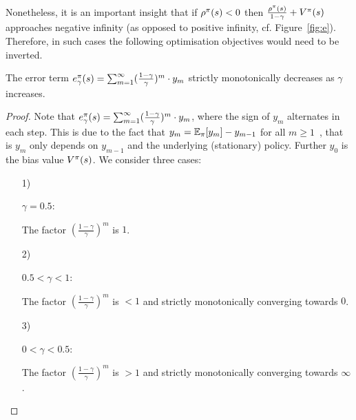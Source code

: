 \documentclass[envcountsame]{llncs}
\begin{document}
\begin{remark}
  Nonetheless, it is an important insight that if \(\rho^{\pi}(s) < 0\) then
  \(\frac{\rho^{\pi}(s)}{1-\gamma} + V^{\pi}(s)\) approaches negative infinity (as opposed to
  positive infinity, cf. Figure~\ref{fig:e}). Therefore, in such cases the following optimisation
  objectives would need to be inverted.
\end{remark}


\begin{lemma}
  \label{lem:err}
  The error term
  \(e_{\gamma}^{\pi}(s) = \sum_{m=1}^{\infty}(\frac{1-\gamma}{\gamma})^{m} \cdot y_{m}\) strictly
  monotonically decreases as $\gamma$ increases.
\end{lemma}

\begin{proof}
  Note that \(e_{\gamma}^{\pi}(s) = \sum_{m=1}^{\infty}(\frac{1-\gamma}{\gamma})^{m} \cdot y_{m}\),
  where the sign of \(y_{m}\) alternates in each step. This is due to the fact that
  \(y_{m} = \operatorname*{\mathbb{E}}_{\pi} [ y_{m} ] - y_{m-1}\) for all \(m \geqslant 1\)~\cite[p.346]{Puterman94}, that
  is \(y_{m}\) only depends on \(y_{m-1}\) and the underlying (stationary) policy. Further \(y_{0}\)
  is the bias value \(V^{\pi}(s)\).
  We consider three cases:
  \begin{enumerate}
  \item[1)]
    \begin{minipage}[t]{0.17\textwidth}
      \(\gamma = 0.5\):
    \end{minipage}
    The factor \((\frac{1-\gamma}{\gamma})^{m}\) is $1$.
  \item[2)]
    \begin{minipage}[t]{0.17\textwidth}
      \(0.5 < \gamma < 1\):
    \end{minipage}
    The factor \((\frac{1-\gamma}{\gamma})^{m}\) is $<1$ and strictly monotonically converging towards $0$.
  \item[3)]
    \begin{minipage}[t]{0.17\textwidth}
      \(0 < \gamma < 0.5\):
    \end{minipage}
    The factor \((\frac{1-\gamma}{\gamma})^{m}\) is $>1$ and strictly monotonically converging towards $\infty$.
  \end{enumerate}


\end{proof}
\end{document}
